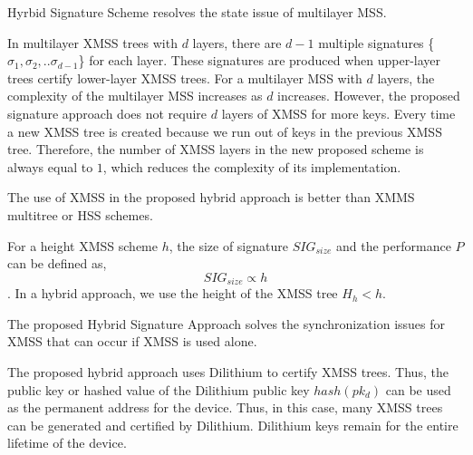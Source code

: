 \documentclass[lettersize,journal]{IEEEtran}
\begin{document}
\begin{prop} \label{prop:hybridsolvesmulti}
Hyrbid Signature Scheme resolves the state issue of multilayer MSS.
\end{prop}
In multilayer XMSS trees with $d$ layers, there are $d-1$ multiple signatures \{$\sigma_1,\sigma_2, .. \sigma_{d-1} $\} for each layer.
These signatures are produced when upper-layer trees certify lower-layer
XMSS trees.
For a multilayer MSS with $d$ layers,
the complexity of the multilayer MSS increases as $d$ increases.
However, the proposed signature approach does not require $d$ layers of XMSS for more keys.
Every time a new XMSS tree is created because we run out of keys in the previous XMSS tree.
Therefore, the number of XMSS layers in the new proposed scheme is always equal to $1$, which reduces the complexity of its implementation.

\begin{prop}
The use of XMSS in the proposed hybrid approach is better than XMMS multitree or HSS schemes.
\end{prop}
For a height XMSS scheme $h$, the size of signature $SIG_{size}$ and the performance $P$ can be defined as, 
$$SIG_{size} \propto h$$.
In a hybrid approach, we use the height of the XMSS tree $H_h < h$.

\begin{prop} \label{prop:synchronization}
The proposed Hybrid Signature Approach solves the synchronization issues for XMSS that can occur if XMSS is used alone.
\end{prop}
The proposed hybrid approach uses Dilithium to certify XMSS trees.
Thus, the public key or hashed value of the Dilithium public key $hash(pk_d)$ can be used as the permanent address for the device.
Thus, in this case, many XMSS trees can be generated and certified by Dilithium.
Dilithium keys remain for the entire lifetime of the device.
\end{document}
